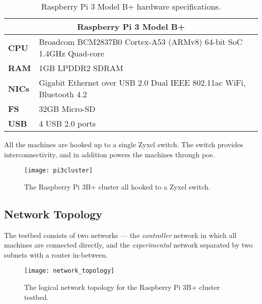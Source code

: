 \begin{wraptable}{r}{5cm}
    \begin{tabular}{ |p{1cm}|p{3cm}| }
        \hline
        \multicolumn{2}{|c|}{\textbf{Raspberry Pi 3 Model B+}} \\
        \hline
        \textbf{CPU} & Broadcom BCM2837B0 \newline Cortex-A53 (ARMv8) 64-bit SoC 1.4GHz Quad-core \\
        \hline
        \textbf{RAM} & 1GB LPDDR2 SDRAM \\
        \hline
        \textbf{NICs} & Gigabit Ethernet over USB 2.0 \newline Dual IEEE 802.11ac WiFi, Bluetooth 4.2 \\
        \hline
        \textbf{FS} & 32GB Micro-SD \\
        \hline
        \textbf{USB} & 4 USB 2.0 ports \\
        \hline
    \end{tabular}
    \caption{Raspberry Pi 3 Model B+ hardware specifications.}
\end{wraptable}

All the machines are hooked up to a single Zyxel switch. The switch provides interconnectivity, and in addition powers the machines through \gls{poe}. 

\begin{figure}[H]
    \texttt{[image: pi3cluster]}
    \captionsetup{width=1.0\linewidth,justification=raggedright,singlelinecheck=false}
    \caption{The Raspberry Pi 3B+ cluster all hooked to a Zyxel switch.}
    \label{fig:pi3cluster}
\end{figure}

\clearpage




\subsection{Network Topology} \label{network_topology}

The testbed consists of two networks --- the \textit{controller} network in which all machines are connected directly, and the \textit{experimental} network separated by two subnets with a router in-between.

\begin{figure}[H]
    \centering
    \texttt{[image: network\_topology]}
    \captionsetup{width=0.6\linewidth}
    \caption{The logical network topology for the Raspberry Pi 3B+ cluster testbed.}
    \label{fig:network_topology}
\end{figure}


